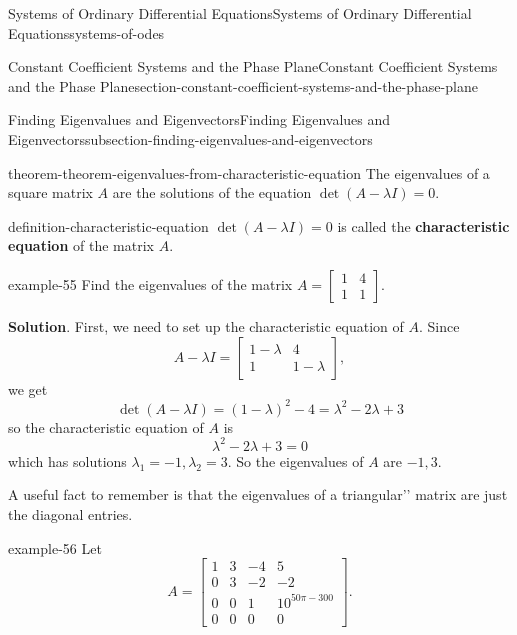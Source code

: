 \documentclass[oneside,10pt,]{book}
\newcommand{\terminology}[1]{\textbf{#1}}
\numberwithin{equation}{section}
\newcommand{\amp}{&}
\begin{document}
\begin{chapterptx}{Systems of Ordinary Differential Equations}{}{Systems of Ordinary Differential Equations}{}{}{systems-of-odes}
\begin{sectionptx}{Constant Coefficient Systems and the Phase Plane}{}{Constant Coefficient Systems and the Phase Plane}{}{}{section-constant-coefficient-systems-and-the-phase-plane}
\begin{subsectionptx}{Finding Eigenvalues and Eigenvectors}{}{Finding Eigenvalues and Eigenvectors}{}{}{subsection-finding-eigenvalues-and-eigenvectors}
\begin{theorem}{}{}{theorem-theorem-eigenvalues-from-characteristic-equation}%
\hypertarget{p-332}{}%
The eigenvalues of a square matrix \(A\) are the solutions of the equation \(\det(A-\lambda I) = 0\).%
\end{theorem}
\begin{definition}{}{definition-characteristic-equation}%
\hypertarget{p-333}{}%
\(\det(A-\lambda I)=0\) is called the \terminology{characteristic equation} of the matrix \(A\).%
\end{definition}
\begin{example}{}{example-55}%
\hypertarget{p-334}{}%
Find the eigenvalues of the matrix \(A = \begin{bmatrix}1\amp 4\\1\amp 1\end{bmatrix}\).%
\par\smallskip%
\noindent\textbf{Solution}.\hypertarget{solution-52}{}\quad%
\hypertarget{p-335}{}%
First, we need to set up the characteristic equation of \(A\). Since%
\begin{equation*}
A-\lambda I = \begin{bmatrix}1-\lambda \amp  4 \\ 1 \amp  1-\lambda\end{bmatrix},
\end{equation*}
we get%
\begin{equation*}
\det(A-\lambda I) = (1-\lambda)^{2} - 4 = \lambda^{2}-2\lambda+3
\end{equation*}
so the characteristic equation of \(A\) is%
\begin{equation*}
\lambda^{2}-2\lambda+3 = 0
\end{equation*}
which has solutions \(\lambda_{1} = -1,\lambda_{2} = 3\). So the eigenvalues of \(A\) are \(-1,3\).%
\end{example}
\hypertarget{p-336}{}%
A useful fact to remember is that the eigenvalues of a \textasciigrave{}\textasciigrave{}triangular'{}'{} matrix are just the diagonal entries.%
\begin{example}{}{example-56}%
\hypertarget{p-337}{}%
Let%
\begin{equation*}
A = \begin{bmatrix}1 \amp  3 \amp  -4 \amp  5 \\ 0 \amp  3 \amp  -2 \amp  -2 \\ 0 \amp  0 \amp  1 \amp  10^{50\pi-300} \\ 0 \amp  0 \amp  0 \amp  0\end{bmatrix}.

\end{equation*}
\end{example}
\end{subsectionptx}
\end{sectionptx}
\end{chapterptx}
\end{document}
